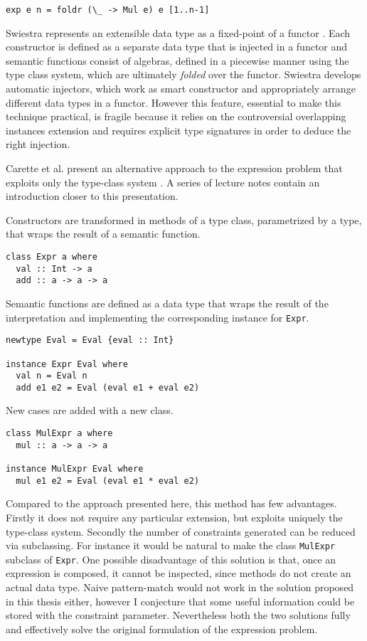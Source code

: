 \documentclass[../Thesis.tex]{subfiles}
\begin{document}
\begin{verbatim}
exp e n = foldr (\_ -> Mul e) e [1..n-1]
\end{verbatim}

Swiestra represents an extensible data type as a fixed-point of a functor \cite{Swierstra08DTL}. Each constructor is defined as a separate data type
that is injected in a functor and semantic functions consist of algebras,
defined in a piecewise manner using the type class system, which are ultimately \emph{folded} over the functor.
Swiestra develops automatic injectors, which work as smart constructor
and appropriately arrange different data types in a functor.
However this feature, essential to make this technique practical, is fragile because it relies on the controversial overlapping instances extension and requires explicit type signatures in order to deduce the right injection.

Carette et al.  present an alternative approach to the expression problem that exploits only the type-class system \cite{Carette09FTP}. A series of lecture notes \cite{Oleg12FTP} contain an introduction closer to this presentation.

Constructors are transformed in methods of a type class, parametrized by a type, that wraps the result of a semantic function.

\begin{verbatim}
class Expr a where
  val :: Int -> a
  add :: a -> a -> a
\end{verbatim}

Semantic functions are defined as a data type that wraps the result of
the interpretation and implementing the corresponding 
instance for \texttt{Expr}.

\begin{verbatim}
newtype Eval = Eval {eval :: Int}

instance Expr Eval where
  val n = Eval n
  add e1 e2 = Eval (eval e1 + eval e2)
\end{verbatim}

New cases are added with a new class.

\begin{verbatim}
class MulExpr a where
  mul :: a -> a -> a

instance MulExpr Eval where
  mul e1 e2 = Eval (eval e1 * eval e2)
\end{verbatim}

Compared to the approach presented here, this method has few advantages.
Firstly it does not require any particular extension, but exploits uniquely 
the type-class system. Secondly the number of constraints generated can be
reduced via subclassing. For instance it would be natural to make the class
\texttt{MulExpr} subclass of \texttt{Expr}.
One possible disadvantage of this solution is that, once an expression is composed, it cannot be inspected, since methods do not create an actual data type. Naive pattern-match would not work in the solution proposed in this
thesis either, however I conjecture that some useful information could be stored with the constraint parameter. 
Nevertheless both the two solutions fully and effectively solve the original formulation of the expression problem.
\end{document}
